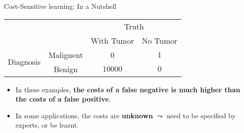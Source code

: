 \documentclass[11pt,compress,t,notes=noshow, xcolor=table]{beamer}
\begin{document}
\begin{vbframe}{Cost-Sensitive learning: In a Nutshell}
{        \begin{minipage}{0.49\textwidth}
            \begin{table}[]
                \centering
                \begin{tabular}{p{1cm}c|cc}
                    & &\multicolumn{2}{c}{Truth} \\
                    & & With Tumor & No Tumor  \\
                    \hline
                    \multirow{2}{*}{\parbox{1cm}{Diagnosis}} & Malignent & 0 & $ 1 $\\
                    & Benign & $10000$ & $0$   \\
                \end{tabular}
            \end{table}
        \end{minipage}
        \hfill
        \begin{minipage}{0.49\textwidth}
            \begin{itemize}
                \scriptsize
                \item In these examples, \textbf{the costs of a false negative is much higher than the costs of a false positive}.
                \vspace{15pt}
                
                \item In some applications, the costs are \textbf{unknown} $\leadsto$ need to be specified by experts, or be learnt.
            \end{itemize}   
        \end{minipage}
		
	}
\end{vbframe}
\end{document}

